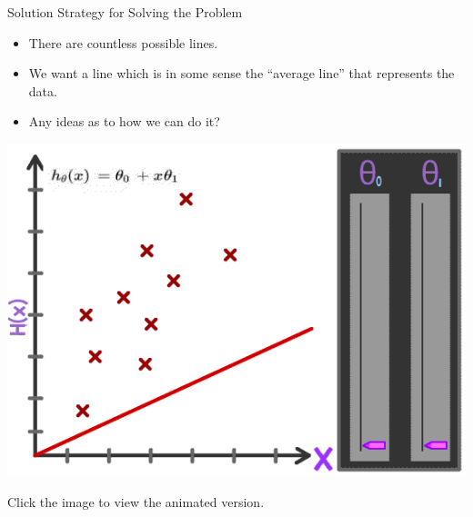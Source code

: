 \begin{frame}{Solution Strategy for Solving the Problem}
    \begin{itemize}
        \item There are countless possible lines.
        \item We want a line which is in some sense the “average line” that represents the data.
        \item Any ideas as to how we can do it?
    \end{itemize}

    \begin{center}
        \href{https://i.imgur.com/A1tDy8G.gif}{
            \includegraphics[width=0.6\linewidth]{images/linear-regression/linear-regression-6.png}
        }

        {\scriptsize Click the image to view the animated version.}
    \end{center}
\end{frame}

